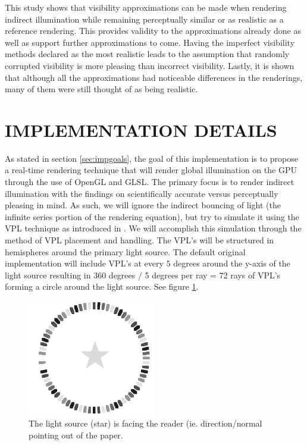 This study shows that visibility approximations can be made when rendering indirect illumination while remaining perceptually similar or as realistic as a reference rendering.  This provides validity to the approximations already done as well as support further approximations to come.  Having the imperfect visibility methods declared as the most realistic leads to the assumption that randomly corrupted visibility is more pleasing than incorrect visibility.  Lastly, it is shown that although all the approximations had noticeable differences in the renderings, many of them were still thought of as being realistic.

\section{IMPLEMENTATION DETAILS} \label{sec:impdetails}

As stated in section \ref{sec:impgoals}, the goal of this implementation is to propose a real-time rendering technique that will render global illumination on the GPU through the use of OpenGL and GLSL.  The primary focus is to render indirect illumination with the findings on scientifically accurate versus perceptually pleasing in mind.  As such, we will ignore the indirect bouncing of light (the infinite series portion of the rendering equation), but try to simulate it using the VPL technique as introduced in \cite{Keller1997}.  We will accomplish this simulation through the method of VPL placement and handling.  The VPL's will be structured in hemispheres around the primary light source.  The default original implementation will include VPL's at every $5$ degrees around the y-axis of the light source resulting in 360 degrees / 5 degrees per ray = 72 rays of VPL's forming a circle around the light source. See figure \ref{fig:3.1}.

\begin{figure}[h!]
  \centering
    \includegraphics[width=0.5\textwidth]{Figure31_gray.jpg}
  \caption{The light source (star) is facing the reader (ie. direction/normal pointing out of the paper.}
	\label{fig:3.1}
\end{figure}


